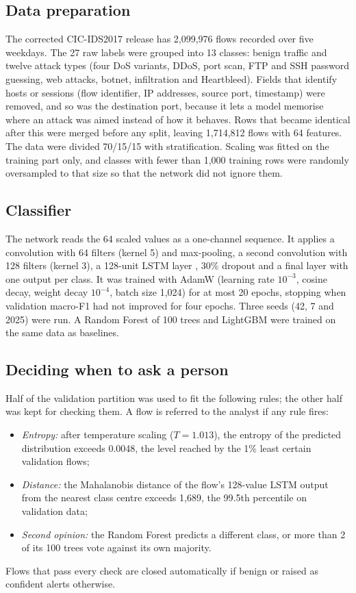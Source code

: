 \documentclass[conference]{IEEEtran}
\begin{document}
\subsection{Data preparation}
The corrected CIC-IDS2017 release \cite{engelen2021troubleshooting,liu2022error} has 2,099,976
flows recorded over five weekdays. The 27 raw labels were grouped into 13 classes: benign traffic
and twelve attack types (four DoS variants, DDoS, port scan, FTP and SSH password guessing, web
attacks, botnet, infiltration and Heartbleed). Fields that identify hosts or sessions (flow
identifier, IP addresses, source port, timestamp) were removed, and so was the destination port,
because it lets a model memorise where an attack was aimed instead of how it behaves. Rows that
became identical after this were merged before any split, leaving 1,714,812 flows with 64
features. The data were divided 70/15/15 with stratification. Scaling was fitted on the training
part only, and classes with fewer than 1,000 training rows were randomly oversampled to that
size so that the network did not ignore them.

\subsection{Classifier}
The network reads the 64 scaled values as a one-channel sequence. It applies a convolution with 64
filters (kernel 5) and max-pooling, a second convolution with 128 filters (kernel 3), a 128-unit LSTM
layer \cite{hochreiter1997lstm}, 30\% dropout and a final layer with one output per class. It was trained with
AdamW (learning rate $10^{-3}$, cosine decay, weight decay $10^{-4}$, batch size 1,024) for at
most 20 epochs, stopping when validation macro-F1 had not improved for four epochs. Three seeds
(42, 7 and 2025) were run. A Random Forest \cite{breiman2001random} of 100 trees and LightGBM
\cite{ke2017lightgbm} were trained on the same data as baselines.

\subsection{Deciding when to ask a person}
Half of the validation partition was used to fit the following rules; the other half was kept for
checking them. A flow is referred to the analyst if any rule fires:
\begin{itemize}
\item \textit{Entropy:} after temperature scaling ($T=1.013$), the entropy of the predicted
distribution exceeds 0.0048, the level reached by the 1\% least certain validation flows;
\item \textit{Distance:} the Mahalanobis distance of the flow's 128-value LSTM output from the
nearest class centre exceeds 1,689, the 99.5th percentile on validation data;
\item \textit{Second opinion:} the Random Forest predicts a different class, or more than 2 of its
100 trees vote against its own majority.
\end{itemize}
Flows that pass every check are closed automatically if benign or raised as confident alerts
otherwise.
\end{document}
